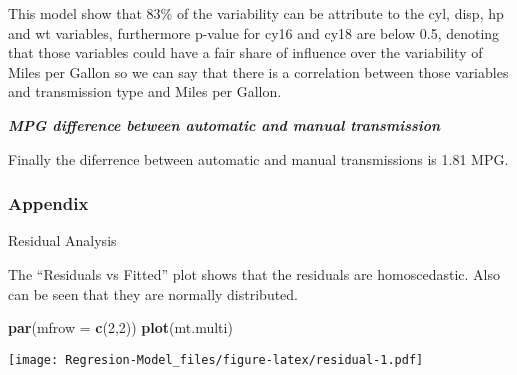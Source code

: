 \documentclass[
]{article}
\newenvironment{Shaded}{\begin{snugshade}}{\end{snugshade}}
\newcommand{\DataTypeTok}[1]{\textcolor[rgb]{0.13,0.29,0.53}{#1}}
\newcommand{\DecValTok}[1]{\textcolor[rgb]{0.00,0.00,0.81}{#1}}
\newcommand{\KeywordTok}[1]{\textcolor[rgb]{0.13,0.29,0.53}{\textbf{#1}}}
\newcommand{\NormalTok}[1]{#1}
\newcommand{\OperatorTok}[1]{\textcolor[rgb]{0.81,0.36,0.00}{\textbf{#1}}}
\newcommand{\StringTok}[1]{\textcolor[rgb]{0.31,0.60,0.02}{#1}}
\begin{document}
This model show that 83\% of the variability can be attribute to the
cyl, disp, hp and wt variables, furthermore p-value for cy16 and cy18
are below 0.5, denoting that those variables could have a fair share of
influence over the variability of Miles per Gallon so we can say that
there is a correlation between those variables and transmission type and
Miles per Gallon.

\textbf{\emph{MPG difference between automatic and manual transmission}}

\begin{Shaded}
\end{Shaded}

Finally the diferrence between automatic and manual transmissions is
1.81 MPG.

\hypertarget{appendix}{%
\subsubsection{Appendix}\label{appendix}}

Residual Analysis

The ``Residuals vs Fitted'' plot shows that the residuals are
homoscedastic. Also can be seen that they are normally distributed.

\begin{Shaded}
\begin{Highlighting}[]
\KeywordTok{par}\NormalTok{(}\DataTypeTok{mfrow =} \KeywordTok{c}\NormalTok{(}\DecValTok{2}\NormalTok{,}\DecValTok{2}\NormalTok{))}
\KeywordTok{plot}\NormalTok{(mt.multi)}
\end{Highlighting}
\end{Shaded}

\texttt{[image: Regresion-Model\_files/figure-latex/residual-1.pdf]}
\end{document}
